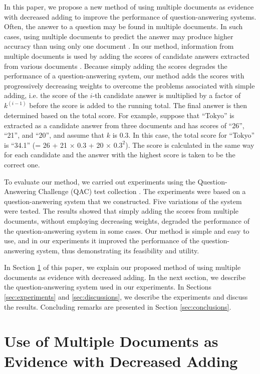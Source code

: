 In this paper, we propose a new method of using 
multiple documents as evidence with decreased adding
to improve the performance of question-answering systems.
Often, the answer to a question may be found in multiple documents. 
In such cases, using multiple documents to predict the answer 
may produce higher accuracy than using only one document \cite{Charles,Dumis,magnini,takaki_ntcir3_qa}. 
In our method, information from multiple documents 
is used by adding the scores of candidate answers 
extracted from various documents \cite{Dumis,takaki_ntcir3_qa}. 
Because simply adding the scores degrades the performance of a question-answering system, 
our method adds the scores with progressively decreasing weights to overcome the problems associated with simple adding, i.e. 
the score of the $i$-th candidate answer is multiplied by a factor of $k^{(i-1)}$ 
before the score is added to the running total. 
The final answer is then determined based on the total score. 
For example, suppose that ``Tokyo'' is extracted as a candidate answer from three documents and 
has scores of ``26'', ``21'', and ``20'', and assume that $k$ is 0.3. 
In this case, the total score for ``Tokyo'' is ``34.1'' (= 26 + 21 $\times$ 0.3 + 20 $\times$ $0.3^2$). 
The score is calculated in the same way for each candidate 
and the answer with the highest score is taken to be the correct one.

To evaluate our method, we carried out experiments using the Question-Answering Challenge (QAC) test collection \cite{qac1}. 
The experiments were based on a 
question-answering system that we constructed. Five variations 
of the system were tested. 
The results showed that 
simply adding the scores from multiple documents, without employing decreasing weights, 
degraded the performance of the question-answering system in some cases. 
Our method is simple and easy to use, and 
in our experiments it improved the performance of the question-answering system, thus
demonstrating its feasibility and utility. 

In Section \ref{sec:method} of this paper, we explain our proposed method 
of using multiple documents as evidence with decreased adding. 
In the next section, we describe
the question-answering system used in our experiments. 
In Sections \ref{sec:experiments} and \ref{sec:discussions}, we describe
the experiments 
and discuss the results. 
Concluding remarks are presented in Section \ref{sec:conclusions}.  

\section{Use of Multiple Documents as Evidence with Decreased Adding}
\label{sec:method}

